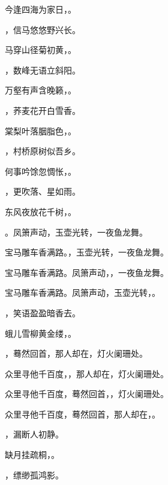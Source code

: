 \documentclass[12pt, a4paper, addpoints]{exam}
\begin{document}
\begin{questions}
\question[2] 今逢四海为家日，\uline{\qquad\qquad\qquad\qquad}。

\question[2] \uline{\qquad\qquad\qquad\qquad}，信马悠悠野兴长。

\question[2] 马穿山径菊初黄，\uline{\qquad\qquad\qquad\qquad}。

\question[2] \uline{\qquad\qquad\qquad\qquad}，数峰无语立斜阳。

\question[2] 万壑有声含晚籁，\uline{\qquad\qquad\qquad\qquad}。

\question[2] \uline{\qquad\qquad\qquad\qquad}，荞麦花开白雪香。

\question[2] 棠梨叶落胭脂色，\uline{\qquad\qquad\qquad\qquad}。

\question[2] \uline{\qquad\qquad\qquad\qquad}，村桥原树似吾乡。

\question[2] 何事吟馀忽惆怅，\uline{\qquad\qquad\qquad\qquad}。

\question[2] \uline{\qquad\qquad\qquad\qquad}，更吹落、星如雨。

\question[2] 东风夜放花千树，\uline{\qquad\qquad\qquad\qquad}。

\question[2] \uline{\qquad\qquad\qquad\qquad}。凤箫声动，玉壶光转，一夜鱼龙舞。

\question[2] 宝马雕车香满路。\uline{\qquad\qquad\qquad\qquad}，玉壶光转，一夜鱼龙舞。

\question[2] 宝马雕车香满路。凤箫声动，\uline{\qquad\qquad\qquad\qquad}，一夜鱼龙舞。

\question[2] 宝马雕车香满路。凤箫声动，玉壶光转，\uline{\qquad\qquad\qquad\qquad}。

\question[2] \uline{\qquad\qquad\qquad\qquad}，笑语盈盈暗香去。

\question[2] 蛾儿雪柳黄金缕，\uline{\qquad\qquad\qquad\qquad}。

\question[2] \uline{\qquad\qquad\qquad\qquad}，蓦然回首，那人却在，灯火阑珊处。

\question[2] 众里寻他千百度，\uline{\qquad\qquad\qquad\qquad}，那人却在，灯火阑珊处。

\question[2] 众里寻他千百度，蓦然回首，\uline{\qquad\qquad\qquad\qquad}，灯火阑珊处。

\question[2] 众里寻他千百度，蓦然回首，那人却在，\uline{\qquad\qquad\qquad\qquad}。

\question[2] \uline{\qquad\qquad\qquad\qquad}，漏断人初静。

\question[2] 缺月挂疏桐，\uline{\qquad\qquad\qquad\qquad}。

\question[2] \uline{\qquad\qquad\qquad\qquad}，缥缈孤鸿影。


\end{questions}
\end{document}
